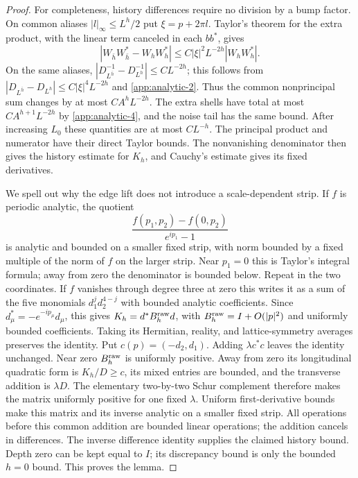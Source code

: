 \begin{proof}
For completeness, history differences require no division by a bump
factor.  On common aliases $|l|_\infty\le L^h/2$ put
$\xi=p+2\pi l$.  Taylor's theorem for the extra product, with the
linear term canceled in each $bb^*$, gives
\[
 |W_{\bar h}W_{\bar h}^*-W_hW_h^*|
       \le C|\xi|^2L^{-2h}|W_hW_h^*|.
\]
On the same aliases,
$|D_{L^{\bar h}}^{-1}-D_{L^h}^{-1}|\le CL^{-2h}$;
this follows from
$|D_{L^{\bar h}}-D_{L^h}|\le C|\xi|^4L^{-2h}$ and \eqref{app:analytic-2}.
Thus the common nonprincipal sum changes by at most
$CA^hL^{-2h}$.  The extra shells have total at most
$CA^{h+1}L^{-2h}$ by \eqref{app:analytic-4}, and the noise tail has the same bound.
After increasing $L_0$ these quantities are at most $CL^{-h}$.
The principal product and numerator have their direct Taylor bounds.
The nonvanishing denominator then gives the history estimate for
$K_h$, and Cauchy's estimate gives its fixed derivatives.

We spell out why the edge lift does not introduce a scale-dependent
strip.  If $f$ is periodic analytic, the quotient
\[
 \frac{f(p_1,p_2)-f(0,p_2)}{e^{ip_1}-1}
\]
is analytic and bounded on a smaller fixed strip, with norm bounded
by a fixed multiple of the norm of $f$ on the larger strip.
Near $p_1=0$ this is Taylor's integral formula; away from zero the
denominator is bounded below.  Repeat in the two coordinates.
If $f$ vanishes through degree three at zero this writes it as a
sum of the five monomials $d_1^j d_2^{4-j}$ with bounded analytic
coefficients.  Since $d_\mu^*=-e^{-ip_\mu}d_\mu$, this gives
$K_h=d^*B_h^{\rm raw}d$, with
$B_h^{\rm raw}=I+O(|p|^2)$ and uniformly bounded coefficients.
Taking its Hermitian, reality, and lattice-symmetry averages preserves
the identity.  Put $c(p)=(-d_2,d_1)$.
Adding $\lambda c^*c$ leaves the identity unchanged.  Near zero
$B_h^{\rm raw}$ is uniformly positive.  Away from zero its
longitudinal quadratic form is $K_h/D\ge c$, its mixed entries are
bounded, and the transverse addition is $\lambda D$.
The elementary two-by-two Schur complement therefore makes the
matrix uniformly positive for one fixed $\lambda$.
Uniform first-derivative bounds make this matrix and its inverse
analytic on a smaller fixed strip.  All operations before this
common addition are bounded linear operations; the addition cancels
in differences.  The inverse difference identity supplies the claimed
history bound.  Depth zero can be kept equal to $I$; its discrepancy
bound is only the bounded $h=0$ bound.  This proves the lemma.
\end{proof}

